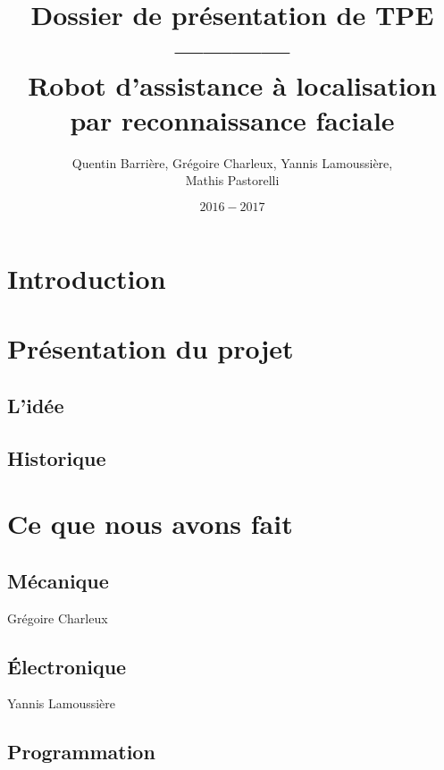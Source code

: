 \documentclass[12pt,a4paper]{article}
\author{Quentin Barri\`ere, Gr\'egoire Charleux, Yannis Lamoussi\`ere,\\ Mathis Pastorelli}
\date{\(2016-2017\)}
\begin{document}
	\title{Dossier de pr\'esentation de TPE \\ ------------ \\ \Large Robot d'assistance \`a localisation par reconnaissance faciale}
	\maketitle
	
	\newpage
	
	\tableofcontents
	
	\newpage
	
	\section*{Introduction}
	
	\section{Pr\'esentation du projet}
	
	\subsection{L'id\'ee}
	
	\subsection{Historique}
	
	\section{Ce que nous avons fait}
	
	\subsection{M\'ecanique}
	
	\nopagebreak
	\hfill Gr\'egoire Charleux
	
	\subsection{\'Electronique}
	
	\nopagebreak
	\hfill Yannis Lamoussi\`ere
	
	\subsection{Programmation}
	
\end{document}
